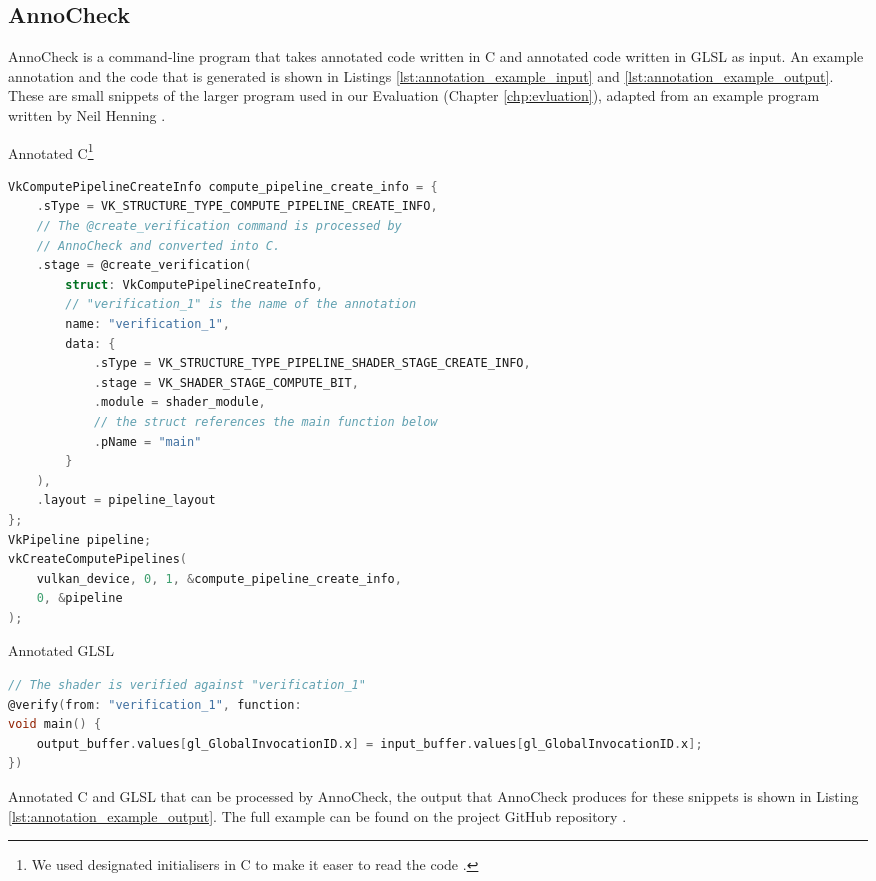 \documentclass[a4paper,12pt,twoside,openright]{report}
\begin{document}
\subsection{AnnoCheck}

AnnoCheck is a command-line program that takes annotated code written in C and
annotated code written in GLSL as input. An example annotation and the code
that is generated is shown in Listings \ref{lst:annotation_example_input} and
\ref{lst:annotation_example_output}. These are small snippets of the larger
program used in our Evaluation (Chapter \ref{chp:evluation}), adapted from an
example program written by Neil Henning \cite{VulkanComputeExampleSource}
\cite{VulkanComputeExampleBlog}.

\begin{lstfloat}
\begin{center}
Annotated C\footnote{We used designated initialisers in C to make it easer to
read the code \cite{DesignatedInitC}.}
\end{center}
\begin{lstlisting}[language=C]
VkComputePipelineCreateInfo compute_pipeline_create_info = {
    .sType = VK_STRUCTURE_TYPE_COMPUTE_PIPELINE_CREATE_INFO,
    // The @create_verification command is processed by
    // AnnoCheck and converted into C.
    .stage = @create_verification(
        struct: VkComputePipelineCreateInfo,
        // "verification_1" is the name of the annotation
        name: "verification_1",
        data: {
            .sType = VK_STRUCTURE_TYPE_PIPELINE_SHADER_STAGE_CREATE_INFO,
            .stage = VK_SHADER_STAGE_COMPUTE_BIT,
            .module = shader_module,
            // the struct references the main function below
            .pName = "main"
        }
    ),
    .layout = pipeline_layout
};
VkPipeline pipeline;
vkCreateComputePipelines(
    vulkan_device, 0, 1, &compute_pipeline_create_info,
    0, &pipeline
);
\end{lstlisting}
\begin{center} Annotated GLSL \end{center}
\begin{lstlisting}[language=C]
// The shader is verified against "verification_1"
@verify(from: "verification_1", function:
void main() {
    output_buffer.values[gl_GlobalInvocationID.x] = input_buffer.values[gl_GlobalInvocationID.x];
})
\end{lstlisting}
\caption{Annotated C and GLSL that can be processed by AnnoCheck, the output
that AnnoCheck produces for these snippets is shown in
Listing \ref{lst:annotation_example_output}. The full example can be found on
the project GitHub repository \cite{ProjectSource}.}
\label{lst:annotation_example_input}
\end{lstfloat}
\end{document}
